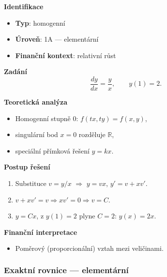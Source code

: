 \begin{example}
\label{ex:1a5}

\textbf{Identifikace}
\begin{itemize}
\item \textbf{Typ}: homogenní
\item \textbf{Úroveň}: 1A — elementární
\item \textbf{Finanční kontext}: relativní růst
\end{itemize}

\textbf{Zadání}
\[
\frac{dy}{dx}=\frac{y}{x}, \qquad y(1)=2.
\]

\textbf{Teoretická analýza}
\begin{itemize}
\item Homogenní stupně $0$: $f(tx,ty)=f(x,y)$,
\item singulární bod $x=0$ rozděluje $\mathbb{R}$,
\item speciální přímková řešení $y=kx$.
\end{itemize}

\textbf{Postup řešení}
\begin{enumerate}
\item Substituce $v=y/x$ $\Rightarrow$ $y=vx$, $y'=v+xv'$.
\item $v+xv'=v \Rightarrow x v' = 0 \Rightarrow v=C$.
\item $y=Cx$, z $y(1)=2$ plyne $C=2$: $y(x)=2x$.
\end{enumerate}

\textbf{Finanční interpretace}
\begin{itemize}
\item Poměrový (proporcionální) vztah mezi veličinami.
\end{itemize}
\end{example}

\subsubsection{Exaktní rovnice — elementární}
\label{subsec:1a-exaktni}

